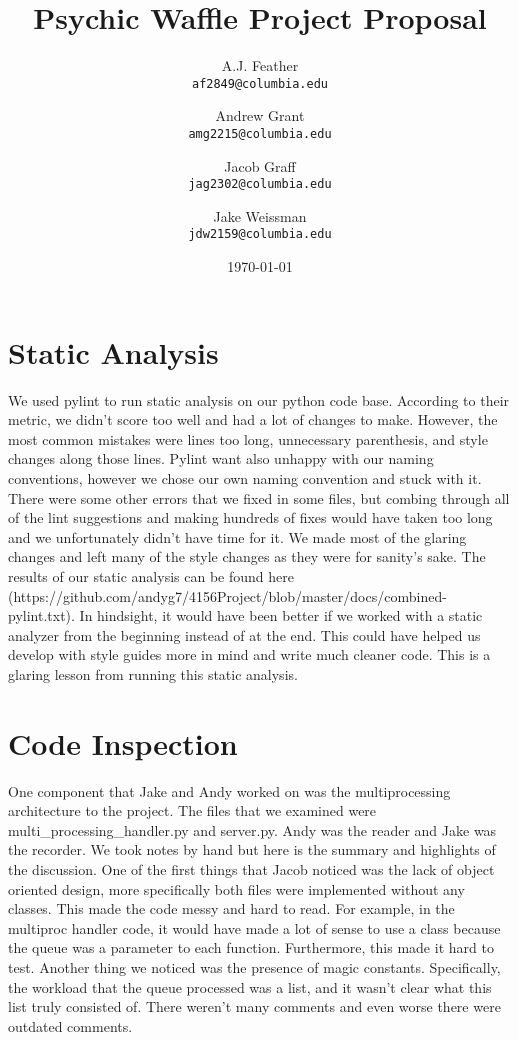 \documentclass{article}
\title{Psychic Waffle Project Proposal}
\author{
    A.J. Feather\\
    \texttt{af2849@columbia.edu}
    \and
    Andrew Grant\\
    \texttt{amg2215@columbia.edu}
    \and
    Jacob Graff\\
    \texttt{jag2302@columbia.edu}
    \and
    Jake Weissman\\
    \texttt{jdw2159@columbia.edu}
}
\date{\today}
\begin{document}
\maketitle

\section{Static Analysis}
We used pylint to run static analysis on our python code base. According to their metric, we didn't score too well and had a lot of changes to make. However, the most common mistakes were lines too long, unnecessary parenthesis, and style changes along those lines. Pylint want also unhappy with our naming conventions, however we chose our own naming convention and stuck with it. There were some other errors that we fixed in some files, but combing through all of the lint suggestions and making hundreds of fixes would have taken too long and we unfortunately didn't have time for it. We made most of the glaring changes and left many of the style changes as they were for sanity's sake. The results of our static analysis can be found here (https://github.com/andyg7/4156Project/blob/master/docs/combined-pylint.txt). In hindsight, it would have been better if we worked with a static analyzer from the beginning instead of at the end. This could have helped us develop with style guides more in mind and write much cleaner code. This is a glaring lesson from running this static analysis.

\section{Code Inspection}
One component that Jake and Andy worked on was the multiprocessing architecture to the project. The files that we examined were multi\_processing\_handler.py and server.py. Andy was the reader and Jake was the recorder. We took notes by hand but here is the summary and highlights of the discussion. One of the first things that Jacob noticed was the lack of object oriented design, more specifically both files were implemented without any classes. This made the code messy and hard to read. For example, in the multiproc handler code, it would have made a lot of sense to use a class because the queue was a parameter to each function. Furthermore, this made it hard to test. Another thing we noticed was the presence of magic constants. Specifically, the workload that the queue processed was a list, and it wasn't clear what this list truly consisted of. There weren't many comments and even worse there were outdated comments.
\end{document}
